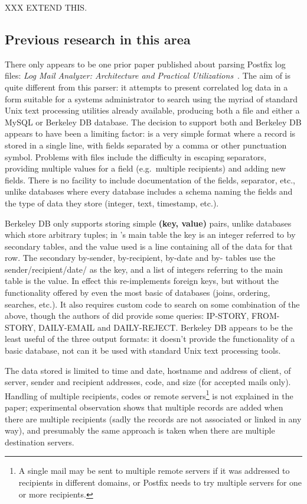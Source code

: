 XXX EXTEND THIS\@.


\subsection{Previous research in this area}

\label{prior art}

There only appears to be one prior paper published about parsing Postfix
log files: \textit{Log Mail Analyzer: Architecture and Practical
Utilizations\/}~\cite{log-mail-analyser}.  The aim of \LMA{} is quite
different from this parser: it attempts to present correlated log data in a
form suitable for a systems administrator to search using the myriad of
standard Unix text processing utilities already available, producing both a
\CSV{} file and either a MySQL or Berkeley DB database.  The decision to
support both \CSV{} and Berkeley DB appears to have been a limiting factor:
\CSV{} is a very simple format where a record is stored in a single line,
with fields separated by a comma or other punctuation symbol.  Problems
with \CSV{} files include the difficulty in escaping separators, providing
multiple values for a field (e.g.\ multiple recipients) and adding new
fields.  There is no facility to include documentation of the fields,
separator, etc., unlike \SQL{} databases where every database includes a
schema naming the fields and the type of data they store (integer, text,
timestamp, etc.).

Berkeley DB only supports storing simple \textbf{(key, value)} pairs,
unlike \SQL{} databases which store arbitrary tuples; in \LMA{}'s main
table the key is an integer referred to by secondary tables, and the value
used is a \CSV{} line containing all of the data for that row.  The
secondary by-sender, by-recipient, by-date and by-\IP{} tables use the
sender/recipient/date/\IP{} as the key, and a \CSV{} list of integers
referring to the main table is the value.  In effect this re-implements
\SQL{} foreign keys, but without the functionality offered by even the most
basic of \SQL{} databases (joins, ordering, searches, etc.).  It also
requires custom code to search on some combination of the above, though the
authors of \LMA{} did provide some queries: IP-STORY, FROM-STORY,
DAILY-EMAIL and DAILY-REJECT\@.  Berkeley DB appears to be the least useful
of the three output formats: it doesn't provide the functionality of a
basic \SQL{} database, not can it be used with standard Unix text
processing tools.

The data stored is limited to time and date, hostname and \IP{} address of
client, \IP{} of server, sender and recipient addresses, \SMTP{} code, and
size (for accepted mails only).  Handling of multiple recipients, \SMTP{}
codes or remote servers\footnote{A single mail may be sent to multiple
remote servers if it was addressed to recipients in different domains, or
Postfix needs to try multiple servers for one or more recipients.} is not
explained in the paper; experimental observation shows that multiple
records are added when there are multiple recipients (sadly the records are
not associated or linked in any way), and presumably the same approach is
taken when there are multiple destination servers.

